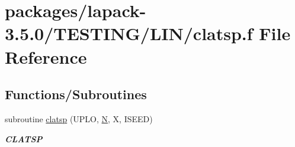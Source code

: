 \hypertarget{clatsp_8f}{}\section{packages/lapack-\/3.5.0/\+T\+E\+S\+T\+I\+N\+G/\+L\+I\+N/clatsp.f File Reference}
\label{clatsp_8f}
\subsection*{Functions/\+Subroutines}
\begin{DoxyCompactItemize}
\item 
subroutine \hyperlink{group__complex__lin_ga11e09919ecf0cb1c756568adcbc33a55}{clatsp} (U\+P\+L\+O, \hyperlink{polmisc_8c_a0240ac851181b84ac374872dc5434ee4}{N}, X, I\+S\+E\+E\+D)
\begin{DoxyCompactList}\small\item\em {\bfseries C\+L\+A\+T\+S\+P} \end{DoxyCompactList}\end{DoxyCompactItemize}
